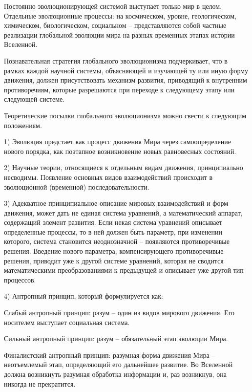 \documentclass[exam_answers.tex]{subfiles}
\begin{document}
Постоянно эволюционирующей системой выступает только мир в целом.
Отдельные эволюционные процессы: на космическом, уровне, геологическом,
химическом, биологическом, социальном – представляются собой частные
реализации глобальной эволюции мира на разных временных этапах истории
Вселенной.

Познавательная стратегия глобального эволюционизма подчеркивает, что в
рамках каждой научной системы, объясняющей и изучающей ту или иную
форму движения, должен присутствовать механизм развития, приводящий к
внутренним противоречиям, которые разрешаются при переходе к следующему
этапу или следующей системе.

Теоретические посылки глобального эволюционизма можно свести к
следующим положениям.

1) Эволюция предстает как процесс движения Мира через
самоопределение нового порядка, как поэтапное возникновение новых
равновесных состояний.

2) Научные теории, относящиеся к отдельным видам движения,
принципиально несводимы. Появление основных видов взаимодействий
происходит в эволюционной (временной) последовательности.

3) Адекватное принципиальное описание мировых взаимодействий и
форм движения, может дать не единая система уравнений, а математический
аппарат, содержащий элемент развития. Если некая система уравнений
описывает определенные процессы, то в ней должен быть параметр, при
изменении которого, система становится неоднозначной – появляются
противоречивые решения. Введение нового параметра, компенсирующего
противоречивые решения, приводит уже к другой системе уравнений, которая
не сводится математическими преобразованиями к предыдущей и описывает
уже другой тип процессов.

4) Антропный принцип, который формулируется как:

Слабый антропный принцип: разум – один из видов мирового движения.
Его носителем выступает социальная система.

Сильный антропный принцип: разум – обязательный этап эволюции Мира.

Финалистский антропный принцип: разумная форма движения Мира –
неотъемлемый этап, определяющий его дальнейшее развитие. Во Вселенной
должна возникнуть разумная обработка информации и, раз возникнув, она
никогда не прекратится.
\end{document}
